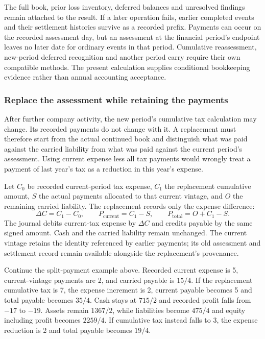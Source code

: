 The full book, prior loss inventory, deferred balances and unresolved findings
remain attached to the result. If a later operation fails, earlier completed
events and their settlement histories survive as a recorded prefix. Payments
can occur on the recorded assessment day, but an assessment at the financial
period's endpoint leaves no later date for ordinary events in that period.
Cumulative reassessment, new-period deferred recognition and another period
carry require their own compatible methods. The present calculation supplies
conditional bookkeeping evidence rather than annual accounting acceptance.


\subsubsection*{Replace the assessment while retaining the payments}
After further company activity, the new period's cumulative tax calculation may
change. Its recorded payments do not change with it. A replacement must therefore
start from the actual continued book and distinguish what was paid against the
carried liability from what was paid against the current period's assessment.
Using current expense less all tax payments would wrongly treat a payment of
last year's tax as a reduction in this year's expense.

Let $C_0$ be recorded current-period tax expense, $C_1$ the replacement cumulative
amount, $S$ the actual payments allocated to that current vintage, and $O$ the
remaining carried liability. The replacement records only the expense difference:
\[
  \Delta C=C_1-C_0,\qquad
  P_{\mathrm{current}}=C_1-S,\qquad
  P_{\mathrm{total}}=O+C_1-S.
\]
The journal debits current-tax expense by $\Delta C$ and credits payable by the
same signed amount. Cash and the carried liability remain unchanged. The current
vintage retains the identity referenced by earlier payments; its old assessment
and settlement record remain available alongside the replacement's provenance.

Continue the split-payment example above. Recorded current expense is 5,
current-vintage payments are 2, and carried payable is $15/4$. If the replacement
cumulative tax is 7, the expense increment is 2, current payable becomes 5 and
total payable becomes $35/4$. Cash stays at $715/2$ and recorded profit falls
from $-17$ to $-19$. Assets remain $1367/2$, while liabilities become $475/4$
and equity including profit becomes $2259/4$. If cumulative tax instead falls
to 3, the expense reduction is 2 and total payable becomes $19/4$.

